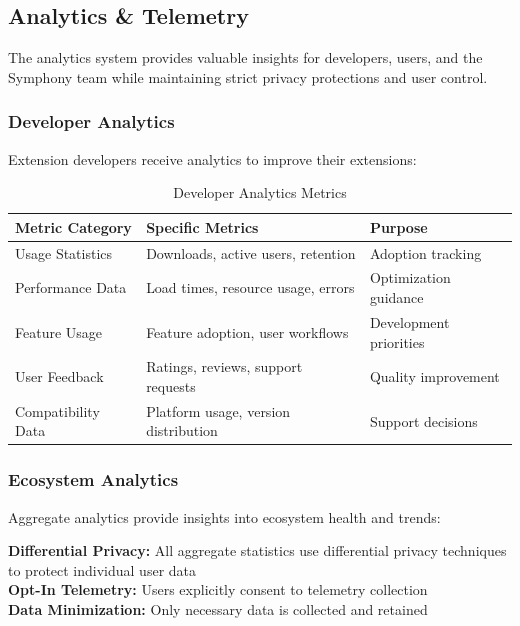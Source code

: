 \subsection{Analytics \& Telemetry}
\label{subsec:analytics-telemetry}

The analytics system provides valuable insights for developers, users, and the Symphony team while maintaining strict privacy protections and user control.

\subsubsection{Developer Analytics}
\label{subsubsec:developer-analytics}

Extension developers receive analytics to improve their extensions:

\begin{table}[h]
\centering
\caption{Developer Analytics Metrics}
\label{tab:developer-analytics}
\begin{tabular}{@{}lll@{}}
\toprule
\textbf{Metric Category} & \textbf{Specific Metrics} & \textbf{Purpose} \\
\midrule
Usage Statistics & Downloads, active users, retention & Adoption tracking \\
Performance Data & Load times, resource usage, errors & Optimization guidance \\
Feature Usage & Feature adoption, user workflows & Development priorities \\
User Feedback & Ratings, reviews, support requests & Quality improvement \\
Compatibility Data & Platform usage, version distribution & Support decisions \\
\bottomrule
\end{tabular}
\end{table}

\subsubsection{Ecosystem Analytics}
\label{subsubsec:ecosystem-analytics}

Aggregate analytics provide insights into ecosystem health and trends:

\begin{infobox}[title=Privacy-Preserving Analytics]
\textbf{Differential Privacy:} All aggregate statistics use differential privacy techniques to protect individual user data \\
\textbf{Opt-In Telemetry:} Users explicitly consent to telemetry collection \\
\textbf{Data Minimization:} Only necessary data is collected and retained
\end{infobox}

